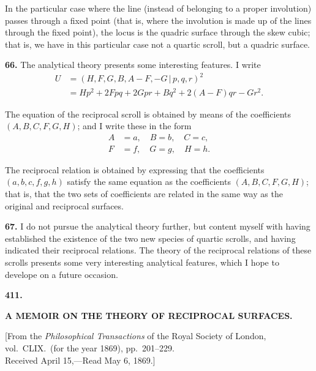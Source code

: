 \documentclass[11pt,a4paper]{article}
\begin{document}
In the particular case where the line (instead of belonging to a proper involution) passes through a fixed point (that is, where the involution is made up of the lines through the fixed point), the locus is the quadric surface through the skew cubic; that is, we have in this particular case not a quartic scroll, but a quadric surface.

\textbf{66.} The analytical theory presents some interesting features. I write
\begin{align*}
U &= (H, F, G, B, A-F, -G \,\vert\, p, q, r)^2 \\
  &= Hp^2 + 2Fpq + 2Gpr + Bq^2 + 2(A-F)qr - Gr^2.
\end{align*}

The equation of the reciprocal scroll is obtained by means of the coefficients $(A, B, C, F, G, H)$; and I write these in the form
\begin{align*}
A &= a, \quad B = b, \quad C = c, \\
F &= f, \quad G = g, \quad H = h.
\end{align*}

The reciprocal relation is obtained by expressing that the coefficients $(a, b, c, f, g, h)$ satisfy the same equation as the coefficients $(A, B, C, F, G, H)$; that is, that the two sets of coefficients are related in the same way as the original and reciprocal surfaces.

\textbf{67.} I do not pursue the analytical theory further, but content myself with having established the existence of the two new species of quartic scrolls, and having indicated their reciprocal relations. The theory of the reciprocal relations of these scrolls presents some very interesting analytical features, which I hope to develope on a future occasion.

\newpage

\begin{center}
{\large\textbf{411.}}
\end{center}

\begin{center}
{\Large\textbf{A MEMOIR ON THE THEORY OF RECIPROCAL SURFACES.}}
\end{center}

\begin{center}
[From the \textit{Philosophical Transactions} of the Royal Society of London,\\
vol.\ CLIX.\ (for the year 1869), pp.~201--229.\\
Received April 15,---Read May 6, 1869.]
\end{center}
\end{document}
